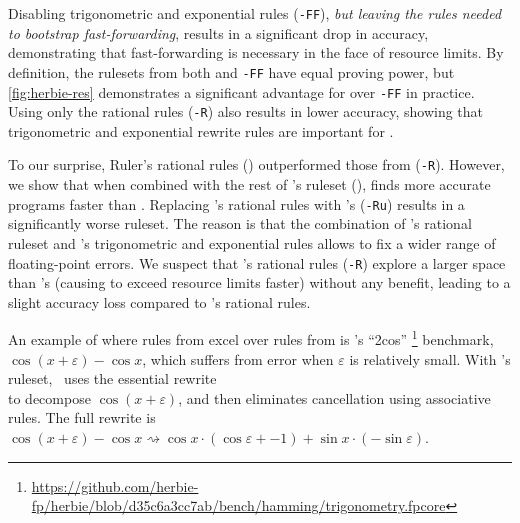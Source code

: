 Disabling trigonometric and exponential rules (\texttt{\enumo-FF}),
  \emph{but leaving the rules needed to bootstrap fast-forwarding},
  results in a significant drop in accuracy,
  demonstrating that fast-forwarding is necessary in
  the face of resource limits.
By definition, the rulesets from both \texttt{\enumo} and \texttt{\enumo-FF} have equal proving power,
  but \autoref{fig:herbie-res} demonstrates
  a significant advantage for \texttt{\enumo} over \texttt{\enumo-FF} in practice.
Using only the rational rules (\texttt{\enumo-R}) also results in lower accuracy,
  showing that trigonometric and exponential rewrite rules are important for \herbie.

To our surprise,
  Ruler's rational rules (\texttt{}) outperformed
  those from \enumo (\texttt{\enumo-R}).
However, we show that when combined with the rest of
  \enumo's ruleset (\texttt{\enumo}), \enumo finds more accurate programs
  faster than .
Replacing \enumo's rational rules with 's (\texttt{\enumo-Ru})
  results in a significantly worse ruleset.
The reason is that the combination of \enumo's rational ruleset
  and \enumo's trigonometric and exponential rules allows \herbie
  to fix a wider range of floating-point errors.
We suspect that \enumo's rational rules (\texttt{\enumo-R}) explore a larger
  space than 's (causing \herbie to exceed resource limits faster)
  without any benefit, leading to a slight accuracy loss compared to
  's rational rules.

An example of where rules from \enumo excel over rules from 
  is \herbie's ``2cos''%
  \footnote{\url{https://github.com/herbie-fp/herbie/blob/d35c6a3cc7ab/bench/hamming/trigonometry.fpcore}}
  benchmark, $\cos(x + \varepsilon) - \cos x$,
  which suffers from error when $\varepsilon$ is relatively small.
With \enumo's ruleset,
  \herbie~uses the essential rewrite
   \\
  to decompose $\cos(x + \varepsilon)$, and then
  eliminates cancellation using associative rules.
The full rewrite is
  $\cos(x + \varepsilon) - \cos x
  \rightsquigarrow
  \cos x \cdot (\cos\varepsilon + -1) + \sin x \cdot (-\sin\varepsilon)$.


